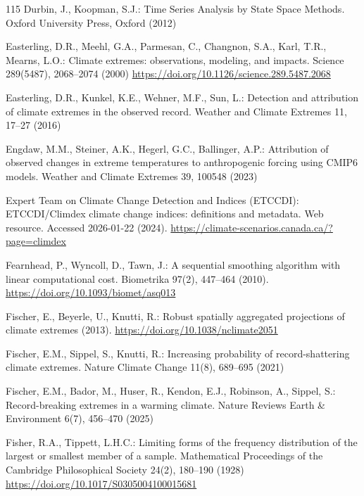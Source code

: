 \documentclass[11pt,a4paper]{article}
\begin{document}
\begin{thebibliography}{115}
		Durbin, J., Koopman, S.J.: Time Series Analysis by State Space Methods. Oxford University Press, Oxford (2012)
		
		Easterling, D.R., Meehl, G.A., Parmesan, C., Changnon, S.A., Karl, T.R., Mearns, L.O.: Climate extremes: observations, modeling, and impacts. Science 289(5487), 2068--2074 (2000) \url{https://doi.org/10.1126/science.289.5487.2068}
		
		Easterling, D.R., Kunkel, K.E., Wehner, M.F., Sun, L.: Detection and attribution of climate extremes in the observed record. Weather and Climate Extremes 11, 17--27 (2016)
		
		Engdaw, M.M., Steiner, A.K., Hegerl, G.C., Ballinger, A.P.: Attribution of observed changes in extreme temperatures to anthropogenic forcing using CMIP6 models. Weather and Climate Extremes 39, 100548 (2023)
		
		Expert Team on Climate Change Detection and Indices (ETCCDI): ETCCDI/Climdex climate change indices: definitions and metadata. Web resource. Accessed 2026-01-22 (2024). \url{https://climate-scenarios.canada.ca/?page=climdex}
		
		Fearnhead, P., Wyncoll, D., Tawn, J.: A sequential smoothing algorithm with linear computational cost. Biometrika 97(2), 447--464 (2010). \url{https://doi.org/10.1093/biomet/asq013}
		
		Fischer, E., Beyerle, U., Knutti, R.: Robust spatially aggregated projections of climate extremes (2013). \url{https://doi.org/10.1038/nclimate2051}
		
		Fischer, E.M., Sippel, S., Knutti, R.: Increasing probability of record-shattering climate extremes. Nature Climate Change 11(8), 689--695 (2021)
		
		Fischer, E.M., Bador, M., Huser, R., Kendon, E.J., Robinson, A., Sippel, S.: Record-breaking extremes in a warming climate. Nature Reviews Earth \& Environment 6(7), 456--470 (2025)
		
		Fisher, R.A., Tippett, L.H.C.: Limiting forms of the frequency distribution of the largest or smallest member of a sample. Mathematical Proceedings of the Cambridge Philosophical Society 24(2), 180--190 (1928)  \url{https://doi.org/10.1017/S0305004100015681}
		

\end{thebibliography}
\end{document}
